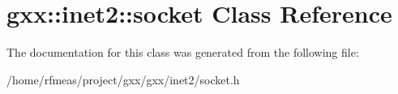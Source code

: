 \hypertarget{classgxx_1_1inet2_1_1socket}{}\section{gxx\+:\+:inet2\+:\+:socket Class Reference}
\label{classgxx_1_1inet2_1_1socket}


The documentation for this class was generated from the following file\+:\begin{DoxyCompactItemize}
\item 
/home/rfmeas/project/gxx/gxx/inet2/socket.\+h\end{DoxyCompactItemize}
